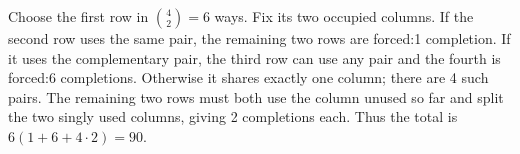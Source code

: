 Choose the first row in $\binom42=6$ ways. Fix its two occupied columns. If the second row uses the same pair, the remaining two rows are forced:1 completion. If it uses the complementary pair, the third row can use any pair and the fourth is forced:6 completions. Otherwise it shares exactly one column; there are 4 such pairs. The remaining two rows must both use the column unused so far and split the two singly used columns, giving 2 completions each. Thus the total is $6(1+6+4\cdot2)=\boxed{90}$.
